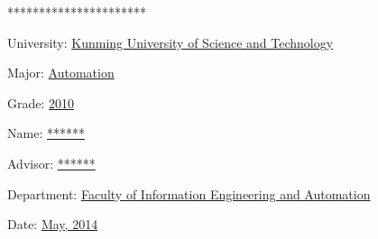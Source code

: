 \documentclass[12pt,a4paper]{article}
\begin{document}
\clearpage
\TNRB
{
\begin{center}
\vspace{10mm}
\fontsize{18pt}{36pt}
\selectfont
**********************\\[50mm]
\end{center}
}
{
\fontsize{14pt}{24pt}
\selectfont
{}\baselineskip
University: \uline{\hfill  Kunming University of Science and Technology \hfill} \par
Major: \uline{\hfill  Automation \hfill} \par
Grade: \uline{\hfill  2010 \hfill} \par
Name: \uline{\hfill  ******* \hfill} \par
Advisor: \uline{\hfill  ******* \hfill} \par
Department: \uline{\hfill {\fontsize{13pt}{22pt}\selectfont Faculty of Information Engineering and Automation \hfill}} \par
Date: \uline{\hfill  May, 2014 \hfill} \par
}
\thispagestyle{empty}
\newpage
\clearpage
\phantom{s}
\thispagestyle{empty}
\clearpage
\end{document}
